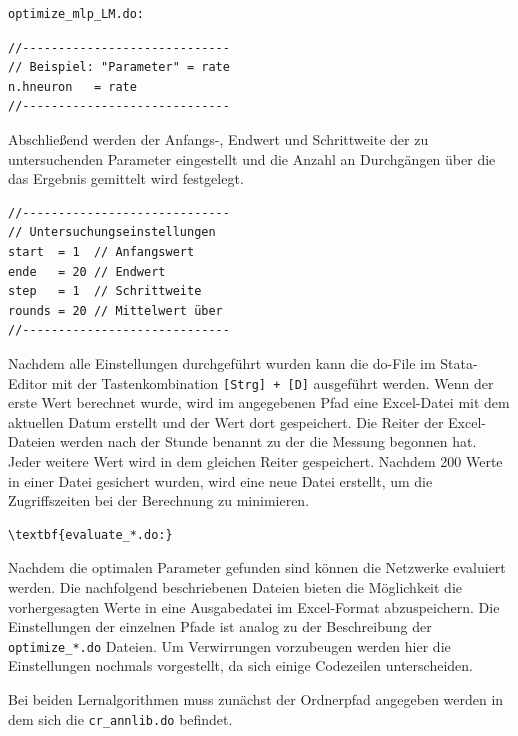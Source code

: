 \begin{Verbatim}
optimize_mlp_LM.do:
\end{Verbatim}
{
\begin{lstlisting}[firstnumber=300]
//-----------------------------
// Beispiel: "Parameter" = rate
n.hneuron	= rate
//-----------------------------
\end{lstlisting}
}

Abschließend werden der Anfangs-, Endwert und Schrittweite der zu untersuchenden Parameter eingestellt und die Anzahl an Durchgängen über die das Ergebnis gemittelt wird festgelegt.

{
\begin{lstlisting}[firstnumber=270]
//-----------------------------
// Untersuchungseinstellungen
start  = 1  // Anfangswert
ende   = 20 // Endwert
step   = 1  // Schrittweite
rounds = 20 // Mittelwert über
//-----------------------------
\end{lstlisting}
}

Nachdem alle Einstellungen durchgeführt wurden kann die do-File im Stata-Editor mit der Tastenkombination \verb|[Strg] + [D]| ausgeführt werden. Wenn der erste Wert berechnet wurde, wird im angegebenen Pfad eine Excel-Datei mit dem aktuellen Datum erstellt und der Wert dort gespeichert. Die Reiter der Excel-Dateien werden nach der Stunde benannt zu der die Messung begonnen hat. Jeder weitere Wert wird in dem gleichen Reiter gespeichert. Nachdem 200 Werte in einer Datei gesichert wurden, wird eine neue Datei erstellt, um die Zugriffszeiten bei der Berechnung zu minimieren.\\


\begin{Verbatim}[commandchars=\\\{\}]
\textbf{evaluate_*.do:}
\end{Verbatim}
Nachdem die optimalen Parameter gefunden sind können die Netzwerke evaluiert werden. Die nachfolgend beschriebenen Dateien bieten die Möglichkeit die vorhergesagten Werte in eine Ausgabedatei im Excel-Format abzuspeichern.
Die Einstellungen der einzelnen Pfade ist analog zu der Beschreibung der \verb|optimize_*.do| Dateien. Um Verwirrungen vorzubeugen werden hier die Einstellungen nochmals vorgestellt, da sich einige Codezeilen unterscheiden.

Bei beiden Lernalgorithmen muss zunächst der Ordnerpfad angegeben werden in dem sich die \verb|cr_annlib.do| befindet.

